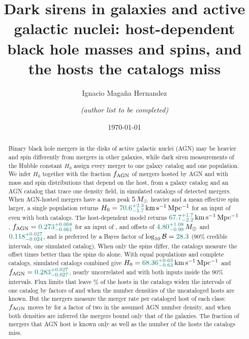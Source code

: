 \documentclass[aps,prd,reprint,twocolumn,superscriptaddress,nofootinbib,floatfix]{revtex4-2}
\newcommand{\msun}{\,M_\odot}
\newcommand{\kms}{{\rm km\,s^{-1}\,Mpc^{-1}}}
\newcommand{\fagn}{f_{\rm AGN}}
\newcommand{\lB}{\log_{10}\mathcal{B}}
\begin{document}
\title{Dark sirens in galaxies and active galactic nuclei: host-dependent black
hole masses and spins, and the hosts the catalogs miss}

\author{Ignacio Maga\~na Hernandez}
\author{\textit{(author list to be completed)}}
\noaffiliation

\date{\today}

\begin{abstract}
Binary black hole mergers in the disks of active galactic nuclei (AGN) may be
heavier and spin differently from mergers in other galaxies, while dark siren
measurements of the Hubble constant $H_0$ assign every merger to one galaxy
catalog and one population. We infer $H_0$ together with the fraction $\fagn$
of mergers hosted by AGN and with mass and spin distributions that depend on
the host, from a galaxy catalog and an AGN catalog that trace one density
field, in simulated catalogs of \MockNev{} detected mergers. When
AGN-hosted mergers have a mass peak $\MockDmuG\msun$ heavier and a mean
effective spin \MockDmuChi{} larger, a single population returns
$H_0=\CommonHzero\,\kms$ for an input of \MockHzero{} even with both
catalogs. The host-dependent model returns $\HDFixHzero\,\kms$,
$\fagn=\HDFixfAGN$ for an input of \MockfAGN, and offsets of
$\HDFixDmuG\msun$ and $\HDFixDmuChi$, and is preferred by a Bayes factor of
$\lB=\LBOffsetsVsCommon$ (90\% credible intervals, one simulated catalog).
When only the spins differ, the catalogs measure the offset
\SpinDmuChiWidthRatio{} times better than the spins do alone. With equal populations and complete catalogs, \JointNcat{}
simulated catalogs combined give $H_0=\JointHzeroComb\,\kms$ and
$\fagn=\JointfComb$, nearly uncorrelated and with both inputs inside the
90\% intervals. Flux limits that leave \MockCompEighteen\% of the hosts in
the catalogs widen the intervals of one catalog by factors of
\FluxHzeroRatioEighteen{} and \FluxfRatioEighteen{} when the number
densities of the uncataloged hosts are known. But the mergers measure the merger rate per cataloged host of each
class: $\fagn$ moves by \DeltafTwoTwentyOne{} for a factor of two in the
assumed AGN number density, and when both densities are inferred the mergers
bound only that of the galaxies. The fraction of mergers that AGN host is known only as well as
the number of the hosts the catalogs miss.
\end{abstract}

\maketitle
\end{document}
